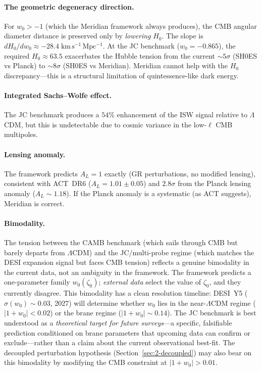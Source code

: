 \paragraph{The geometric degeneracy direction.} For $w_0 > -1$ (which the Meridian framework always produces), the CMB angular diameter distance is preserved only by \emph{lowering} $H_0$. The slope is $dH_0/dw_0 \approx -28.4\;\mathrm{km\,s^{-1}\,Mpc^{-1}}$. At the JC benchmark ($w_0 = -0.865$), the required $H_0 \approx 63.5$ exacerbates the Hubble tension from the current $\sim\!5\sigma$ (SH0ES vs Planck) to $\sim\!8\sigma$ (SH0ES vs Meridian). Meridian cannot help with the $H_0$ discrepancy---this is a structural limitation of quintessence-like dark energy.

\paragraph{Integrated Sachs--Wolfe effect.} The JC benchmark produces a $54\%$ enhancement of the ISW signal relative to $\Lambda$CDM, but this is undetectable due to cosmic variance in the low-$\ell$ CMB multipoles.

\paragraph{Lensing anomaly.} The framework predicts $A_L = 1$ exactly (GR perturbations, no modified lensing), consistent with ACT~DR6 ($A_L = 1.01 \pm 0.05$) and $2.8\sigma$ from the Planck lensing anomaly ($A_L \sim 1.18$). If the Planck anomaly is a systematic (as ACT suggests), Meridian is correct.

\paragraph{Bimodality.} The tension between the CAMB benchmark (which sails through CMB but barely departs from $\Lambda$CDM) and the JC/multi-probe regime (which matches the DESI expansion signal but faces CMB tension) reflects a genuine bimodality in the current data, not an ambiguity in the framework. The framework predicts a one-parameter family $w_0(\zeta_0)$; \emph{external data} select the value of $\zeta_0$, and they currently disagree.  This bimodality has a clean resolution timeline: DESI~Y5 ($\sigma(w_0) \sim 0.03$, 2027) will determine whether $w_0$ lies in the near-$\Lambda$CDM regime ($|1+w_0| < 0.02$) or the brane regime ($|1+w_0| \sim 0.14$).  The JC benchmark is best understood as a \emph{theoretical target for future surveys}---a specific, falsifiable prediction conditioned on brane parameters that upcoming data can confirm or exclude---rather than a claim about the current observational best-fit. The decoupled perturbation hypothesis (Section~\ref{sec:2-decoupled}) may also bear on this bimodality by modifying the CMB constraint at $|1+w_0| > 0.01$.

